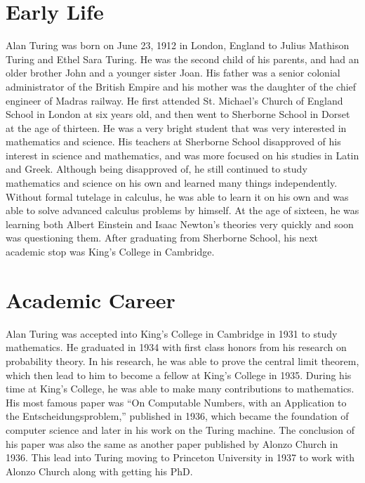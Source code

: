 \documentclass[12pt]{article}
\begin{document}
\section*{Early Life}
Alan Turing was born on June 23, 1912 in London, England to Julius Mathison Turing and Ethel Sara Turing.
He was the second child of his parents, and had an older brother John and a younger sister Joan.
His father was a senior colonial administrator of the British Empire
and his mother was the daughter of the chief engineer of Madras railway.
He first attended St. Michael's Church of England School in London
at six years old, and then went to Sherborne School in Dorset at the age of thirteen.
He was a very bright student that was very interested in mathematics and science.
His teachers at Sherborne School disapproved of his interest in science and mathematics,
and was more focused on his studies in Latin and Greek.
Although being disapproved of, he still continued to study mathematics and science on his own
and learned many things independently.
Without formal tutelage in calculus, he was able to learn it on his own and was able to solve 
advanced calculus problems by himself. At the age of sixteen, he was learning both
Albert Einstein and Isaac Newton's theories very quickly and soon was questioning them.
After graduating from Sherborne School, his next academic stop was King's College in Cambridge.

\section*{Academic Career}
Alan Turing was accepted into King's College in Cambridge in 1931 to study mathematics.
He graduated in 1934 with first class honors from his research on probability theory.
In his research, he was able to prove the central limit theorem, which then lead to him
to become a fellow at King's College in 1935.
During his time at King's College, he was able to make many contributions to mathematics.
His most famous paper was ``On Computable Numbers, with an Application to the Entscheidungsproblem,''
published in 1936, which became the foundation of computer science and later in his work on the Turing machine.
The conclusion of his paper was also the same as another paper published by Alonzo Church in 1936.
This lead into Turing moving to Princeton University in 1937 to work with Alonzo Church along with getting his PhD.
\end{document}
